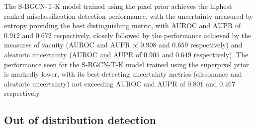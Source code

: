 \documentclass[
twocolumn,
]{ceurart}
\begin{document}

The S-BGCN-T-K model trained using the pixel prior achieves the highest ranked misclassification detection performance, with the uncertainty measured by entropy providing the best distinguishing metric, with AUROC and AUPR of $0.912$ and $0.672$ respectively, closely followed by the performance achieved by the measures of vacuity (AUROC and AUPR of $0.908$ and $0.659$ respectively) and aleatoric uncertainty (AUROC and AUPR of $0.905$ and $0.649$ respectively).
The performance seen for the S-BGCN-T-K model trained using the superpixel prior is markedly lower, with its best-detecting uncertainty metrics (dissonance and aleatoric uncertainty) not exceeding AUROC and AUPR of $0.801$ and $0.467$ respectively.

\subsection{Out of distribution detection}
\end{document}
